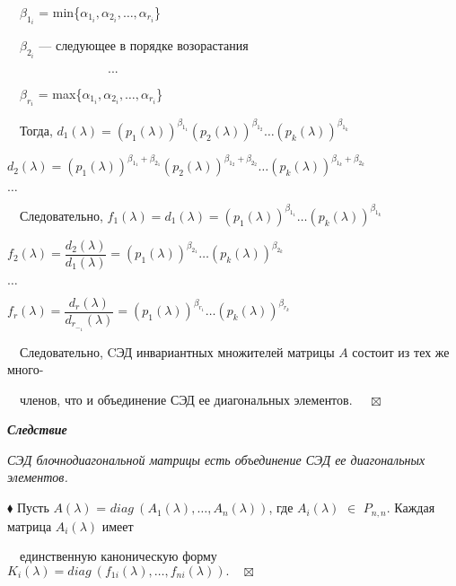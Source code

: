 \documentclass[a4paper, 12pt]{report}
\begin{document}
	$\quad$$\beta_1_i$ = min\{$\alpha_1_i, \alpha_2_i, \dots, \alpha_r_i$\}
	
	$\quad$$\beta_2_i$ --- следующее в порядке возорастания
	
	$\qquad\qquad\qquad\qquad ...$
	
	$\quad$$\beta_r_i$ = max\{$\alpha_1_i, \alpha_2_i, \dots, \alpha_r_i$\}
	\par\bigskip
	$\quad$Тогда, $d_1(\lambda) = (p_1(\lambda))^{\beta_1_1} (p_2(\lambda))^{\beta_1_2} \dots (p_k(\lambda))^{\beta_1_k}$
	
	\hspace{1.7 cm}$d_2(\lambda) = (p_1(\lambda))^{\beta_1_1 + \beta_2_1} (p_2(\lambda))^{\beta_1_2 + \beta_2_2} \dots (p_k(\lambda))^{\beta_1_k + \beta_2_k}$
	
	\hspace{1.7 cm}$\dots$
	
	$\quad$Следовательно, $f_1(\lambda) = d_1(\lambda) = (p_1(\lambda))^{\beta_1_1} \dots (p_k(\lambda))^{\beta_1_k}$
	
	\hspace{3.4 cm}$f_2(\lambda) = \dfrac {d_2(\lambda)}{d_1(\lambda)} = (p_1(\lambda))^{\beta_2_1} \dots (p_k(\lambda))^{\beta_2_k}$
	
	\hspace{3.4 cm}$\dots$
	
	\hspace{3.4 cm}$f_r(\lambda) = \dfrac {d_r(\lambda)}{d_r_-_1(\lambda)} = (p_1(\lambda))^{\beta_{r_1}} \dots (p_k(\lambda))^{\beta_{r_k}}$
	\par\bigskip
	$\quad$Следовательно, CЭД инвариантных множителей матрицы $A$ состоит из тех же много-
	
	$\quad$членов, что и объединение СЭД ее диагональных элементов. $\quad \boxtimes$
	
	\par\bigskip
	\textit{\textbf{Следствие}}
	
	\textit{СЭД блочнодиагональной матрицы есть объединение СЭД ее диагональных элементов.}
	
	$\blacklozenge$ Пусть $A(\lambda)$ = $diag \ (A_1(\lambda), \dots, A_n(\lambda))$, где $A_i(\lambda)$ $\in$ $P_{n,n}$. Каждая матрица $A_i(\lambda)$ имеет 
	
	$\quad$единственную каноническую форму $K_i(\lambda) = diag \ (f_{1i}(\lambda), \dots, f_{ni}(\lambda)). \quad \boxtimes$
	
	
	
	
	
	
	
\end{document}
